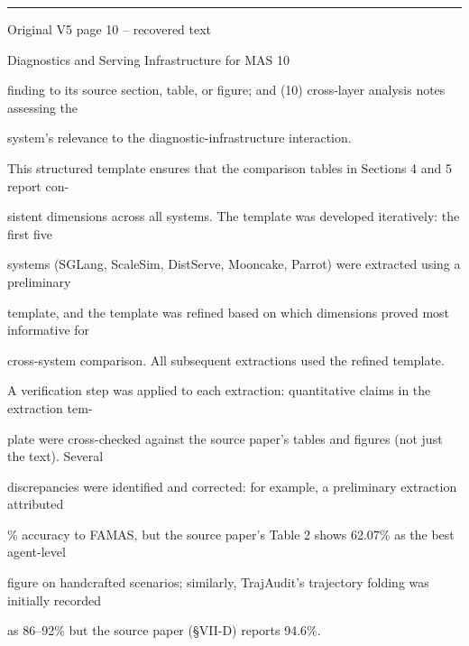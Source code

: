 \par\smallskip\noindent\rule{\textwidth}{0.4pt}\par{\sffamily\footnotesize Original V5 page 10 -- recovered text}\par\begin{flushleft}\footnotesize\ttfamily
\par\smallskip
\par\smallskip
\noindent Diagnostics and Serving Infrastructure for MAS 10\par
\par\smallskip
\par\smallskip
\par\smallskip
\noindent finding to its source section, table, or figure; and (10) cross-layer analysis notes assessing the\par
\noindent system’s relevance to the diagnostic-infrastructure interaction.\par
\noindent  This structured template ensures that the comparison tables in Sections 4 and 5 report con-\par
\noindent sistent dimensions across all systems. The template was developed iteratively: the first five\par
\noindent systems (SGLang, ScaleSim, DistServe, Mooncake, Parrot) were extracted using a preliminary\par
\noindent template, and the template was refined based on which dimensions proved most informative for\par
\noindent cross-system comparison. All subsequent extractions used the refined template.\par
\noindent  A verification step was applied to each extraction: quantitative claims in the extraction tem-\par
\noindent plate were cross-checked against the source paper’s tables and figures (not just the text). Several\par
\noindent discrepancies were identified and corrected: for example, a preliminary extraction attributed\par
{}\% accuracy to FAMAS, but the source paper’s Table 2 shows 62.07\% as the best agent-level\par
\noindent figure on handcrafted scenarios; similarly, TrajAudit’s trajectory folding was initially recorded\par
\noindent as 86–92\% but the source paper (§VII-D) reports 94.6\%.\par

\end{flushleft}
